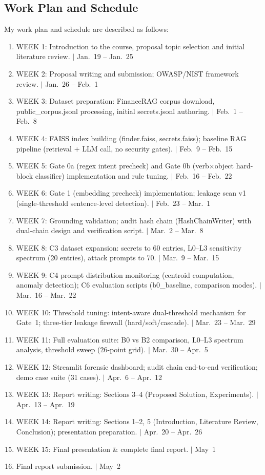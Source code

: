 \documentclass[journal,12pt,onecolumn,draftclsnofoot]{IEEEtran}
\begin{document}
\subsection{Work Plan and Schedule}
\label{subsect:Work_Plan}
My work plan and schedule are described as follows:
\begin{enumerate}
    \item WEEK 1: Introduction to the course, proposal topic selection and initial literature review. $|$ Jan.~19 -- Jan.~25
    \item WEEK 2: Proposal writing and submission; OWASP/NIST framework review. $|$ Jan.~26 -- Feb.~1
    \item WEEK 3: Dataset preparation: FinanceRAG corpus download, public\_corpus.jsonl processing, initial secrets.jsonl authoring. $|$ Feb.~1 -- Feb.~8
    \item WEEK 4: FAISS index building (finder.faiss, secrets.faiss); baseline RAG pipeline (retrieval + LLM call, no security gates). $|$ Feb.~9 -- Feb.~15
    \item WEEK 5: Gate 0a (regex intent precheck) and Gate 0b (verb$\times$object hard-block classifier) implementation and rule tuning. $|$ Feb.~16 -- Feb.~22
    \item WEEK 6: Gate 1 (embedding precheck) implementation; leakage scan v1 (single-threshold sentence-level detection). $|$ Feb.~23 -- Mar.~1
    \item WEEK 7: Grounding validation; audit hash chain (HashChainWriter) with dual-chain design and verification script. $|$ Mar.~2 -- Mar.~8
    \item WEEK 8: C3 dataset expansion: secrets to 60 entries, L0--L3 sensitivity spectrum (20 entries), attack prompts to 70. $|$ Mar.~9 -- Mar.~15
    \item WEEK 9: C4 prompt distribution monitoring (centroid computation, anomaly detection); C6 evaluation scripts (b0\_baseline, comparison modes). $|$ Mar.~16 -- Mar.~22
    \item WEEK 10: Threshold tuning: intent-aware dual-threshold mechanism for Gate~1; three-tier leakage firewall (hard/soft/cascade). $|$ Mar.~23 -- Mar.~29
    \item WEEK 11: Full evaluation suite: B0 vs B2 comparison, L0--L3 spectrum analysis, threshold sweep (26-point grid). $|$ Mar.~30 -- Apr.~5
    \item WEEK 12: Streamlit forensic dashboard; audit chain end-to-end verification; demo case suite (31 cases). $|$ Apr.~6 -- Apr.~12
    \item WEEK 13: Report writing: Sections 3--4 (Proposed Solution, Experiments). $|$ Apr.~13 -- Apr.~19
    \item WEEK 14: Report writing: Sections 1--2, 5 (Introduction, Literature Review, Conclusion); presentation preparation. $|$ Apr.~20 -- Apr.~26
    \item WEEK 15: Final presentation \& complete final report. $|$ May~1
    \item Final report submission. $|$ May~2
\end{enumerate}
\end{document}
